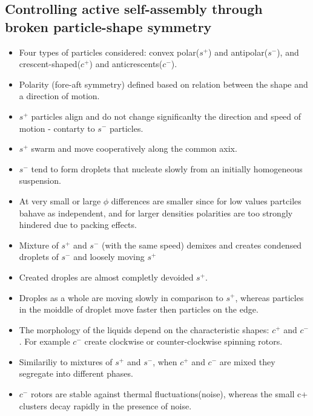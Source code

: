 \documentclass[10pt,a4paper]{article}
\begin{document}
 \subsection{Controlling active self-assembly through broken particle-shape symmetry \cite{dunk:14}} 
 \begin{itemize}
  \item Four types of particles considered: convex polar($s^+$) and antipolar($s^-$), and crescent-shaped($c^+$) and anticrescents($c^-$). 
  \item Polarity (fore-aft symmetry) defined based on relation between the shape and a direction of motion.
  \item $s^+$ particles align and do not change significanlty the direction and speed of motion - contarty to $s^-$ particles. 
  \item $s^+$ swarm and move cooperatively along the common axix.
  \item $s^-$ tend to form droplets that nucleate slowly from an initially homogeneous suspension.
  \item At very small or large $\phi$ differences are smaller since for low values partciles bahave as independent, and for larger
  densities polarities are too strongly hindered due to packing effects.
  \item Mixture of $s^+$ and $s^-$ (with the same speed) demixes and creates condensed droplets of $s^-$ and loosely moving $s^+$
  \item Created droples are almost completly devoided $s^+$.
  \item Droples as a whole are moving slowly in comparison to $s^+$, whereas particles in the moiddle of droplet move faster then particles on the edge.
  \item The morphology of the liquids depend on the characteristic shapes: $c^+$ and $c^-$. 
  For example $c^-$ create clockwise or counter-clockwise spinning rotors.
  \item Similariliy to mixtures of $s^+$ and $s^-$, when $c^+$ and $c^-$ are mixed they segregate into different phases. 
  \item $c^-$ rotors are stable against thermal fluctuations(noise), whereas the small c+ clusters decay rapidly in the presence of noise.
 \end{itemize}
 
\end{document}

